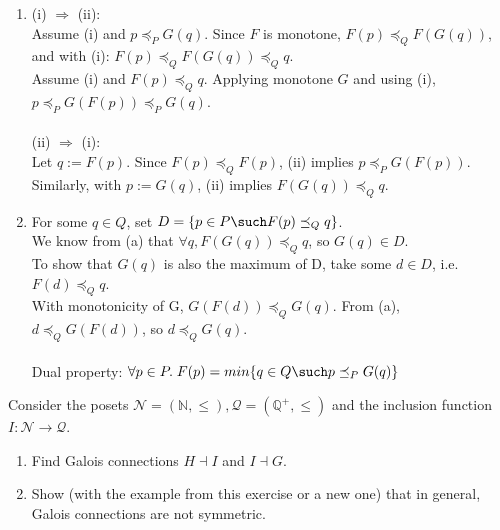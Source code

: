 	\begin{answer}
		\begin{enumerate}
			\item (i) $\Rightarrow$ (ii):
			\\Assume (i) and $p \preceq_P G(q)$. Since $F$ is monotone, $F(p) \preceq_Q F(G(q))$, and with (i):  $F(p) \preceq_Q F(G(q)) \preceq_Q q$.
			\\Assume (i) and $F(p) \preceq_Q q$. Applying monotone $G$ and using (i), $ p \preceq_P G(F(p)) \preceq_P G(q)$.\\ \\
			(ii) $\Rightarrow$ (i): \\Let $q := F(p)$. Since $F(p) \preceq_Q F(p)$, (ii) implies $p \preceq_P G (F (p))$. 
			\\Similarly, with $p := G(q)$,  (ii) implies $F(G (q)) \preceq_Q q$.
			
			\item  For some $q \in Q$, set $D = \{p \in P \such F(p) \preceq_Q q\}$. 
			\\We know from (a) that $\forall q, F(G(q)) \preceq_Q q$, so $G(q) \in D$.
			\\To show that $G(q)$ is also the maximum of D, take some $d \in D$, i.e. $F(d) \preceq_Q q$. 
			\\With monotonicity of G, $G(F(d)) \preceq_Q G(q)$. From (a), $d \preceq_Q G(F(d))$, so $d \preceq_Q G(q)$.
			\\
			\\Dual property: $\forall p \in P.\; F(p) = min\{q \in Q \such p \preceq_P G(q)\} $
		\end{enumerate}
	\end{answer}
	
	
	\begin{exercise}
		Consider the posets $\mathscr{N} = (\mathbb{N}, \leqslant), \mathscr{Q} = (\mathbb{Q}^+, \leqslant)$ 
		and the inclusion function $I : \mathscr{N} \to  \mathscr{Q}$.
		\begin{enumerate}
			\item Find Galois connections $H \dashv I$ and $I \dashv G$.
			\item Show (with the example from this exercise or a new one) that in general, Galois connections are not symmetric.
		\end{enumerate}
	\end{exercise}
	
